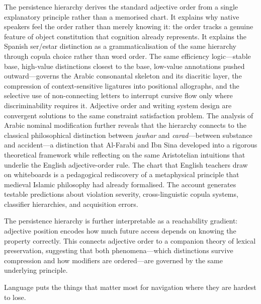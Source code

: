 \documentclass[11pt]{article}
\theoremstyle{rthm}
\theoremstyle{rdef}
\theoremstyle{remark}
\begin{document}
The persistence hierarchy derives the standard adjective order from a single
explanatory principle rather than a memorised chart. It explains why native
speakers feel the order rather than merely knowing it: the order tracks a
genuine feature of object constitution that cognition already represents. It
explains the Spanish ser/estar distinction as a grammaticalisation of the
same hierarchy through copula choice rather than word order. The same
efficiency logic---stable base, high-value distinctions closest to the base,
low-value annotations pushed outward---governs the Arabic consonantal skeleton
and its diacritic layer, the compression of context-sensitive ligatures into
positional allographs, and the selective use of non-connecting letters to
interrupt cursive flow only where discriminability requires it. Adjective
order and writing system design are convergent solutions to the same
constraint satisfaction problem. The
analysis of Arabic nominal modification further reveals that the hierarchy
connects to the classical philosophical distinction between \textit{jawhar}
and \textit{carad}---between substance and accident---a distinction that
Al-Farabi and Ibn Sina developed into a rigorous theoretical framework
while reflecting on the same Aristotelian intuitions that underlie the
English adjective-order rule. The chart that English teachers draw on
whiteboards is a pedagogical rediscovery of a metaphysical principle that
medieval Islamic philosophy had already formalised. The account generates
testable predictions about violation severity, cross-linguistic copula
systems, classifier hierarchies, and acquisition errors.

The persistence hierarchy is further interpretable as a reachability gradient:
adjective position encodes how much future access depends on knowing the
property correctly. This connects adjective order to a companion theory of
lexical preservation, suggesting that both phenomena---which distinctions
survive compression and how modifiers are ordered---are governed by the same
underlying principle.

Language puts the things that matter most for navigation where they are
hardest to lose.
\end{document}
